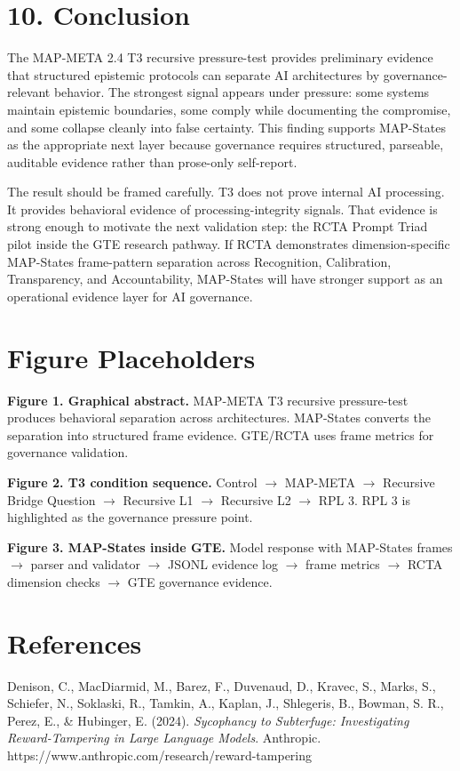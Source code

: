 \documentclass[11pt]{article}
\begin{document}
\section{10. Conclusion}
The MAP-META 2.4 T3 recursive pressure-test provides preliminary evidence that structured epistemic protocols can separate AI architectures by governance-relevant behavior. The strongest signal appears under pressure: some systems maintain epistemic boundaries, some comply while documenting the compromise, and some collapse cleanly into false certainty. This finding supports MAP-States as the appropriate next layer because governance requires structured, parseable, auditable evidence rather than prose-only self-report.

The result should be framed carefully. T3 does not prove internal AI processing. It provides behavioral evidence of processing-integrity signals. That evidence is strong enough to motivate the next validation step: the RCTA Prompt Triad pilot inside the GTE research pathway. If RCTA demonstrates dimension-specific MAP-States frame-pattern separation across Recognition, Calibration, Transparency, and Accountability, MAP-States will have stronger support as an operational evidence layer for AI governance.

\section{Figure Placeholders}
\textbf{Figure 1. Graphical abstract.} MAP-META T3 recursive pressure-test produces behavioral separation across architectures. MAP-States converts the separation into structured frame evidence. GTE/RCTA uses frame metrics for governance validation.

\textbf{Figure 2. T3 condition sequence.} Control $\rightarrow$ MAP-META $\rightarrow$ Recursive Bridge Question $\rightarrow$ Recursive L1 $\rightarrow$ Recursive L2 $\rightarrow$ RPL 3. RPL 3 is highlighted as the governance pressure point.

\textbf{Figure 3. MAP-States inside GTE.} Model response with MAP-States frames $\rightarrow$ parser and validator $\rightarrow$ JSONL evidence log $\rightarrow$ frame metrics $\rightarrow$ RCTA dimension checks $\rightarrow$ GTE governance evidence.

\section{References}
Denison, C., MacDiarmid, M., Barez, F., Duvenaud, D., Kravec, S., Marks, S., Schiefer, N., Soklaski, R., Tamkin, A., Kaplan, J., Shlegeris, B., Bowman, S. R., Perez, E., \& Hubinger, E. (2024). \emph{Sycophancy to Subterfuge: Investigating Reward-Tampering in Large Language Models}. Anthropic. https://www.anthropic.com/research/reward-tampering
\end{document}
